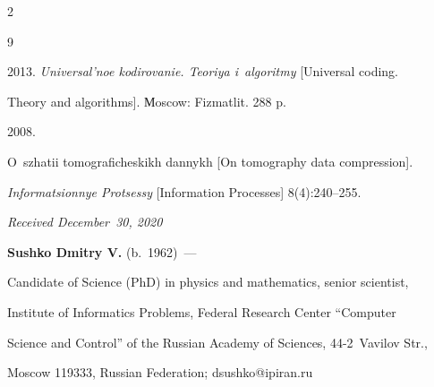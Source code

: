 \begin{multicols}{2}
{{\begin{thebibliography}{9}

 2013. \textit{Universal'noe kodirovanie. Teoriya i~algoritmy} [Universal coding.

 Theory and algorithms]. Мoscow: Fizmatlit. 288 p. 


 2008. 

O~szhatii tomograficheskikh dannykh [On tomography data compression]. 

\textit{Informatsionnye Protsessy} [Information Processes] 8(4):240--255. 

 \end{thebibliography}



 }

 }



\end{multicols}



\vspace*{-4pt}



  \hfill{\small\textit{Received December~30, 2020}}








\vspace*{-12pt}  



\Contrl



\noindent

\textbf{Sushko Dmitry V.} (b.\ 1962)~--- 

Candidate of Science (PhD) in physics and mathematics, senior scientist, 

Institute of Informatics Problems, Federal Research Center ``Computer 

Science and Control'' of the Russian Academy of Sciences, 44-2~Vavilov Str., 

Moscow 119333, Russian Federation; \mbox{dsushko@ipiran.ru}



\label{end\stat}



\renewcommand{\bibname}{\protect\rm Литература}


